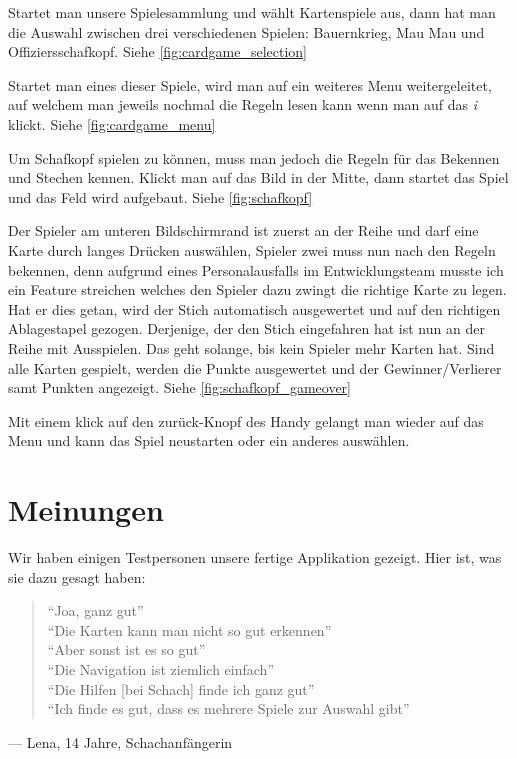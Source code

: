 Startet man unsere Spielesammlung und wählt Kartenspiele aus, dann hat man die
Auswahl zwischen drei verschiedenen Spielen: Bauernkrieg, Mau Mau und
Offiziersschafkopf. Siehe \autoref{fig:cardgame_selection}

Startet man eines dieser Spiele, wird man auf ein weiteres Menu weitergeleitet,
auf welchem man jeweils nochmal die Regeln lesen kann wenn man auf das \emph{i}
klickt. Siehe \autoref{fig:cardgame_menu}

Um Schafkopf spielen zu können, muss man jedoch die Regeln für das Bekennen und
Stechen kennen. Klickt man auf das Bild in der Mitte, dann startet das Spiel und
das Feld wird aufgebaut. Siehe \autoref{fig:schafkopf}

Der Spieler am unteren Bildschirmrand ist zuerst an der Reihe und darf eine
Karte durch langes Drücken auswählen, Spieler zwei muss nun nach den Regeln
bekennen, denn aufgrund eines Personalausfalls im Entwicklungsteam musste ich
ein Feature streichen welches den Spieler dazu zwingt die richtige Karte zu
legen. Hat er dies getan, wird der Stich automatisch ausgewertet und auf den
richtigen Ablagestapel gezogen. Derjenige, der den Stich eingefahren hat ist nun
an der Reihe mit Ausspielen. Das geht solange, bis kein Spieler mehr Karten hat.
Sind alle Karten gespielt, werden die Punkte ausgewertet und der
Gewinner/Verlierer samt Punkten angezeigt. Siehe
\autoref{fig:schafkopf_gameover}

Mit einem klick auf den zurück-Knopf des Handy gelangt man wieder auf das Menu
und kann das Spiel neustarten oder ein anderes auswählen.

\section{Meinungen}

Wir haben einigen Testpersonen unsere fertige Applikation gezeigt. Hier ist, was
sie dazu gesagt haben:

\begin{quote}
``Joa, ganz gut'' \\
``Die Karten kann man nicht so gut erkennen'' \\
``Aber sonst ist es so gut'' \\
``Die Navigation ist ziemlich einfach'' \\
``Die Hilfen [bei Schach] finde ich ganz gut'' \\
``Ich finde es gut, dass es mehrere Spiele zur Auswahl gibt''
\end{quote}
--- Lena, 14 Jahre, Schachanfängerin

